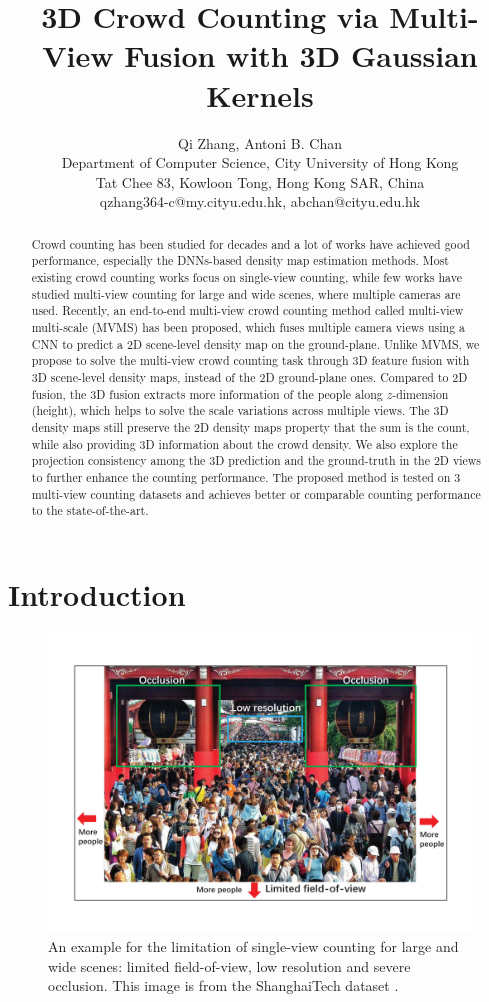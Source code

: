 \documentclass[letterpaper]{article}
\title{3D Crowd Counting via Multi-View Fusion with 3D Gaussian Kernels}
\author{Qi Zhang, Antoni B. Chan \\ %
Department of Computer Science, City University of Hong Kong\\ %
Tat Chee 83, Kowloon Tong, Hong Kong SAR, China\\
qzhang364-c@my.cityu.edu.hk, abchan@cityu.edu.hk %
}
\newcommand{\citep}{\cite}
\begin{document}
\maketitle

\begin{abstract}
  Crowd counting has been studied for decades and a lot of works have achieved %
  good performance, especially the DNNs-based density map estimation methods. Most existing crowd counting works focus on single-view counting, while few works have studied multi-view counting for large and wide scenes, where multiple cameras are used.
  Recently, an end-to-end multi-view crowd counting method called multi-view multi-scale (MVMS) has been proposed, which fuses multiple camera views using a CNN to predict a 2D scene-level density map on the ground-plane. Unlike MVMS, we propose to solve the multi-view crowd counting task through 3D feature fusion with 3D scene-level density maps, instead of the 2D ground-plane ones. %
  Compared to 2D fusion, the 3D fusion extracts more information of the people along $z$-dimension (height), which helps to solve the scale variations across multiple views. The 3D density maps still preserve the 2D density maps property that the sum is the count, while also providing 3D information about the crowd density.
  We also explore the projection consistency among the 3D prediction and the ground-truth in the 2D views
  to further enhance the counting performance. The proposed method is tested on 3 multi-view counting datasets and achieves better or comparable counting performance to the state-of-the-art.
\end{abstract}
\section{Introduction}

\begin{figure}[t]
\centering
   \includegraphics[width=0.95\columnwidth]{Fig_3examples.pdf}
   \caption{An example for the limitation of single-view counting for large and wide scenes: limited field-of-view, low resolution and severe occlusion. This image is from the ShanghaiTech dataset \citep{zhang2015cross}.
   }
\label{fig:example}
\end{figure}
\end{document}
